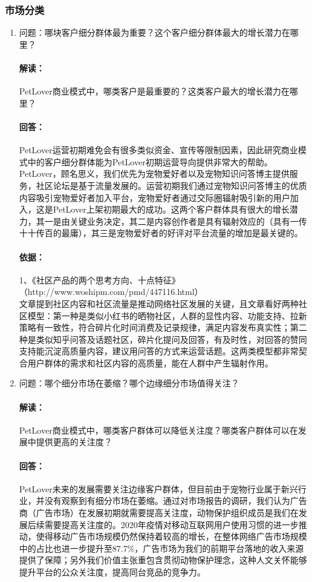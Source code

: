 \documentclass[a4paper]{ctexart}
\begin{document}
\subsubsection{市场分类}
\begin{enumerate}[label=\alph*.]
  \item 问题：哪块客户细分群体最为重要？这个客户细分群体最大的增长潜力在哪里？
  \paragraph{解读：}PetLover商业模式中，哪类客户是最重要的？这类客户最大的增长潜力在哪里？
  \paragraph{回答：}PetLover运营初期难免会有很多类似资金、宣传等限制因素，因此研究商业模式中的客户细分群体能为PetLover初期运营导向提供非常大的帮助。PetLover，顾名思义，我们优先为宠物爱好者以及宠物知识问答博主提供服务，社区论坛是基于流量发展的。运营初期我们通过宠物知识问答博主的优质内容吸引宠物爱好者加入平台，宠物爱好者通过交际圈辐射吸引新的用户加入，这是PetLover上架初期最大的成功。这两个客户群体具有很大的增长潜力，其一是由关键业务决定，其二是内容创作者是具有辐射效应的（具有一传十十传百的最庸），其三是宠物爱好者的好评对平台流量的增加是最关键的。
  \paragraph{依据：}1、《社区产品的两个思考方向、十点特征》\\（http://www.woshipm.com/pmd/447116.html）\\
  文章提到社区内容和社区流量是推动网络社区发展的关键，且文章看好两种社区模型：第一种是类似小红书的晒物社区，人群的显性内容、功能支持、拉新策略有一致性，符合碎片化时间消费及记录规律，满足内容发布真实性；第二种是类似知乎问答及话题社区，碎片化提问及回答，有及时性，对回答的赞同支持能沉淀高质量内容，建议用问答的方式来运营话题。这两类模型都非常契合用户群体的需求和社区内容的高质量，能在人群中产生辐射作用。
  \item 问题：哪个细分市场在萎缩？哪个边缘细分市场值得关注？
  \paragraph{解读：}PetLover商业模式中，哪类客户群体可以降低关注度？哪类客户群体可以在发展中提供更高的关注度？
  \paragraph{回答：}PetLover未来的发展需要关注边缘客户群体，但目前由于宠物行业属于新兴行业，并没有观察到有细分市场在萎缩。通过对市场报告的调研，我们认为广告商（广告市场）在发展初期就需要提高关注度，动物保护组织成员是我们在发展后续需要提高关注度的。2020年疫情对移动互联网用户使用习惯的进一步推动，使得移动广告市场规模仍然保持着较高的增长，在整体网络广告市场规模中的占比也进一步提升至87.7\%，广告市场为我们的前期平台落地的收入来源提供了保障；另外我们价值主张重包含贯彻动物保护理念，这种人文关怀能够提升平台的公众关注度，提高同台竞品的竞争力。

\end{enumerate}
\end{document}

